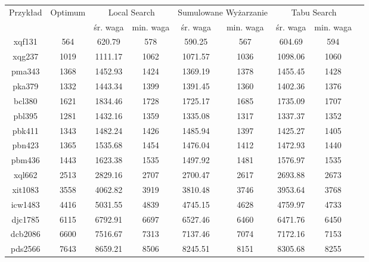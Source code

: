 \documentclass{article}
\begin{document}
\begin{table}[H]
    \centering
    \begin{tabular}{|c|c||c|c||c|c||c|c|c|}
        \hline
        \multirow{2}{*}{Przykład} & \multirow{2}{*}{Optimum} & \multicolumn{2}{|c|}{Local Search} & \multicolumn{2}{|c|}{Sumulowane Wyżarzanie}  & \multicolumn{2}{|c|}{Tabu Search}  \\
        \cline{3-8}
        & & śr. waga & min. waga & śr. waga & min. waga & śr. waga & min. waga \\
        \hline\hline
        xqf131 & 564 & 620.79 & 578 & 590.25 & 567 & 604.69 & 594 \\
        \hline
        xqg237 & 1019 & 1111.17 & 1062 & 1071.57 & 1036 & 1098.06 & 1060 \\
        \hline
        pma343 & 1368 & 1452.93 & 1424 & 1369.19 & 1378 & 1455.45 & 1428 \\
        \hline
        pka379 & 1332 & 1443.34 & 1399 & 1391.45 & 1360 & 1402.36 & 1376 \\
        \hline
        bcl380 & 1621 & 1834.46 & 1728 & 1725.17 & 1685 & 1735.09 & 1707 \\
        \hline
        pbl395 & 1281 & 1432.16 & 1359 & 1335.08 & 1317 & 1337.37 & 1352 \\
        \hline
        pbk411 & 1343 & 1482.24 & 1426 & 1485.94 & 1397 & 1425.27 & 1405 \\
        \hline
        pbn423 & 1365 & 1535.68 & 1454 & 1476.04 & 1412 & 1472.93 & 1440 \\
        \hline
        pbm436 & 1443 & 1623.38 & 1535 & 1497.92 & 1481 & 1576.97 & 1535 \\
        \hline
        xql662 & 2513 & 2829.16 & 2707 & 2700.47 & 2617 & 2693.88 & 2673 \\
        \hline
        xit1083 & 3558 & 4062.82 & 3919 & 3810.48 & 3746 & 3953.64 & 3768 \\
        \hline
        icw1483 & 4416 & 5031.55 & 4839 & 4745.15 & 4628 & 4759.97 & 4733 \\
        \hline
        djc1785 & 6115 & 6792.91 & 6697 & 6527.46 & 6460 & 6471.76 & 6450 \\
        \hline
        dcb2086 & 6600 & 7516.67 & 7313 & 7137.46 & 7074 & 7172.16 & 7153 \\
        \hline
        pds2566 & 7643 & 8659.21 & 8506 & 8245.51 & 8151 & 8305.68 & 8255 \\
        \hline
    \end{tabular}
\end{table}
\end{document}

